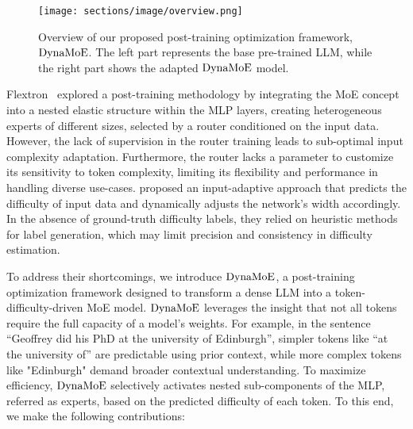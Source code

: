 \begin{figure*}[!t]
    \centering
    \texttt{[image: sections/image/overview.png]} 
    \caption{Overview of our proposed post-training optimization framework, $\operatorname{DynaMoE}$. The left part represents the base pre-trained LLM, while the right part shows the adapted $\operatorname{DynaMoE}$ model.
    }
    \label{fig:overview}
\end{figure*}

Flextron~\citep{Cai2024FlextronMF} explored a post-training methodology by integrating the MoE concept into a nested elastic structure within the MLP layers, creating heterogeneous experts of different sizes, selected by a router conditioned on the input data. However, the lack of supervision in the router training leads to sub-optimal input complexity adaptation. Furthermore, the router lacks a parameter to customize its sensitivity to token complexity, limiting its flexibility and performance in handling diverse use-cases. \citet{Salehi2023SHARCSET} proposed an input-adaptive approach that predicts the difficulty of input data and dynamically adjusts the network's width accordingly. In the absence of ground-truth difficulty labels, they relied on heuristic methods for label generation, which may limit precision and consistency in difficulty estimation.



To address their shortcomings, we introduce $\operatorname{DynaMoE}$, a post-training optimization framework designed to transform a dense LLM into a token-difficulty-driven MoE model. $\operatorname{DynaMoE}$ leverages the insight that not all tokens require the full capacity of a model's weights. For example, in the sentence ``Geoffrey did his PhD at the university of Edinburgh'', simpler tokens like ``at the university of'' are predictable using prior context, while more complex tokens like "Edinburgh" demand broader contextual understanding. To maximize efficiency, $\operatorname{DynaMoE}$ selectively activates nested sub-components of the MLP, referred as experts, based on the predicted difficulty of each token. To this end, we make the following contributions:


